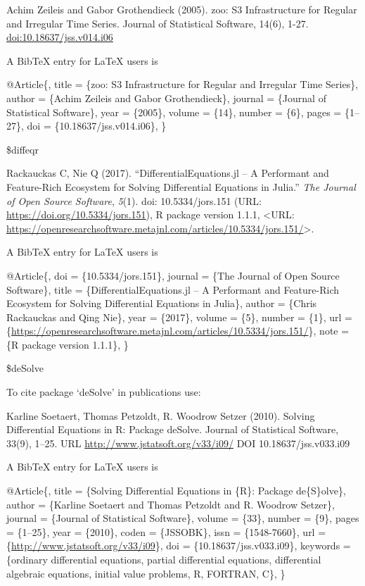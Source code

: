 \documentclass[
]{article}
\begin{document}
Achim Zeileis and Gabor Grothendieck (2005). zoo: S3 Infrastructure for
Regular and Irregular Time Series. Journal of Statistical Software,
14(6), 1-27. \url{doi:10.18637/jss.v014.i06}

A BibTeX entry for LaTeX users is

@Article\{, title = \{zoo: S3 Infrastructure for Regular and Irregular
Time Series\}, author = \{Achim Zeileis and Gabor Grothendieck\},
journal = \{Journal of Statistical Software\}, year = \{2005\}, volume =
\{14\}, number = \{6\}, pages = \{1--27\}, doi =
\{10.18637/jss.v014.i06\}, \}

\$diffeqr

Rackauckas C, Nie Q (2017). ``DifferentialEquations.jl -- A Performant
and Feature-Rich Ecosystem for Solving Differential Equations in
Julia.'' \emph{The Journal of Open Source Software}, \emph{5}(1). doi:
10.5334/jors.151 (URL: \url{https://doi.org/10.5334/jors.151}), R
package version 1.1.1, \textless URL:
\url{https://openresearchsoftware.metajnl.com/articles/10.5334/jors.151/}\textgreater.

A BibTeX entry for LaTeX users is

@Article\{, doi = \{10.5334/jors.151\}, journal = \{The Journal of Open
Source Software\}, title = \{DifferentialEquations.jl -- A Performant
and Feature-Rich Ecosystem for Solving Differential Equations in
Julia\}, author = \{Chris Rackauckas and Qing Nie\}, year = \{2017\},
volume = \{5\}, number = \{1\}, url =
\{\url{https://openresearchsoftware.metajnl.com/articles/10.5334/jors.151/}\},
note = \{R package version 1.1.1\}, \}

\$deSolve

To cite package `deSolve' in publications use:

Karline Soetaert, Thomas Petzoldt, R. Woodrow Setzer (2010). Solving
Differential Equations in R: Package deSolve. Journal of Statistical
Software, 33(9), 1--25. URL \url{http://www.jstatsoft.org/v33/i09/} DOI
10.18637/jss.v033.i09

A BibTeX entry for LaTeX users is

@Article\{, title = \{Solving Differential Equations in \{R\}: Package
de\{S\}olve\}, author = \{Karline Soetaert and Thomas Petzoldt and R.
Woodrow Setzer\}, journal = \{Journal of Statistical Software\}, volume
= \{33\}, number = \{9\}, pages = \{1--25\}, year = \{2010\}, coden =
\{JSSOBK\}, issn = \{1548-7660\}, url =
\{\url{http://www.jstatsoft.org/v33/i09}\}, doi =
\{10.18637/jss.v033.i09\}, keywords = \{ordinary differential equations,
partial differential equations, differential algebraic equations,
initial value problems, R, FORTRAN, C\}, \}
\end{document}
